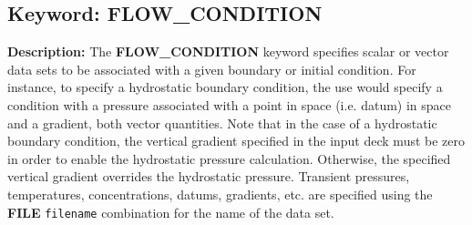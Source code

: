 \documentclass[12pt]{article}
\begin{document}

\newpage
\protect\hypertarget{target_flow_cond}{}

\subsection{Keyword: FLOW\_CONDITION}

{\noindent\bf Description:}
The {\bf FLOW\_CONDITION} keyword specifies scalar or vector data sets to be associated with a given boundary or initial condition.  For instance, to specify a hydrostatic boundary condition, the use would specify a condition with a pressure associated with a point in space (i.e. datum) in space and a gradient, both vector quantities.  Note that in the case of a hydrostatic boundary condition, the vertical gradient specified in the input deck must be zero in order to enable the hydrostatic pressure calculation.  Otherwise, the specified vertical gradient overrides the hydrostatic pressure.  Transient pressures, temperatures, concentrations, datums, gradients, etc. are specified using the {\bf FILE} {\tt filename} combination for the name of the data set.
\end{document}
